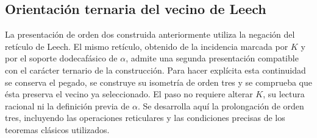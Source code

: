 


\subsection{Orientación ternaria del vecino de Leech}
\label{x_reciprocidad:km:orden-tres-reticular}

La presentación de orden dos construida anteriormente utiliza la negación
del retículo de Leech. El mismo retículo, obtenido de la incidencia marcada
por \(K\) y por el soporte dodecafásico de \(\alpha\), admite una segunda
presentación compatible con el carácter ternario de la construcción.
Para hacer explícita esta continuidad se conserva el pegado, se construye
su isometría de orden tres y se comprueba que ésta preserva el vecino ya
seleccionado. El paso no requiere alterar \(K\), su lectura racional ni
la definición previa de \(\alpha\). Se desarrolla aquí la prolongación de orden tres, incluyendo las operaciones
reticulares y las condiciones precisas de los teoremas clásicos utilizados.


